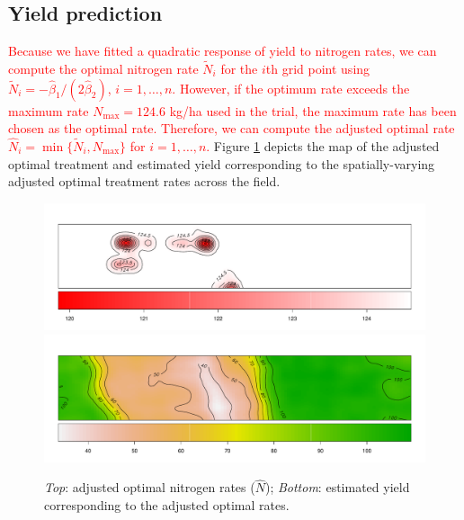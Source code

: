 \documentclass[a4paper]{article}   	%
\begin{document}
	\subsection{Yield prediction}
	
%	
		
	\textcolor{red}{Because we have fitted a quadratic response of yield to nitrogen rates, we can compute the optimal nitrogen rate $\tilde{N}_{i}$ for the $i$th grid point using $\tilde{N}_{i} = -\hat{\beta}_{1}/(2\hat{\beta}_{2})$, $i=1,\ldots,n$. However, if the optimum rate exceeds the maximum rate $N_{\mbox{max}} = 124.6$ kg/ha used in the trial, the maximum rate has been chosen as the optimal rate. Therefore, we can compute the adjusted optimal rate $\hat{N}_i = \min\{ \tilde{N}_i, N_{\mbox{max}}\}$ for $i=1,\ldots,n$.} Figure \ref{fig:optN} depicts the map of the adjusted optimal treatment and estimated yield corresponding to the spatially-varying adjusted optimal treatment rates across the field. %
		
	\begin{figure}[!htp]
		\centering	
		\includegraphics[width=\textwidth]{Images/ST_opNitrogen_v2}
		\includegraphics[width=\textwidth]{Images/ST_opYield}
		\caption{\textit{Top}: adjusted optimal nitrogen rates ($\hat{N}$); \textit{Bottom}: estimated yield corresponding to the adjusted optimal rates.}\label{fig:optN}
	\end{figure}	
	
\end{document}
